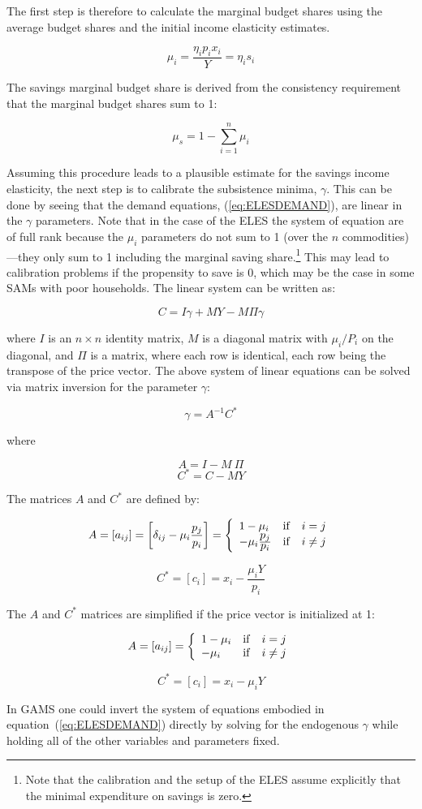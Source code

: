 The first step is therefore to calculate the marginal budget shares using the average budget
shares and the initial income elasticity estimates.

\[
   \mu _i = \frac {\eta_i p_i x_i} {Y} = {\eta _i}{s_i}
\]

The savings marginal budget share is derived from the consistency requirement that the marginal
budget shares sum to 1:

\[
   \mu_s = 1 - \sum\limits_{i = 1}^n {{\mu _i}}
\]

Assuming this procedure leads to a plausible estimate for the savings income elasticity, the next
step is to calibrate the subsistence minima, $\gamma$. This can be done by seeing that the demand
equations, (\ref{eq:ELESDEMAND}), are linear in the $\gamma$ parameters. Note that in the case of
the ELES the system of equation are of full rank because the $\mu_i$ parameters do not sum to 1
(over the $n$ commodities)---they only sum to 1 including the marginal saving share.\footnote{Note
that the calibration and the setup of the ELES assume explicitly that the minimal expenditure on
savings is zero.}
This may lead to calibration problems if the propensity to save is 0, which may be the case in
some SAMs with poor households. The linear system can be written as:

\[
   C = I\gamma  + MY - M \Pi \gamma
\]

\noindent where $I$ is an $n \times n$ identity matrix, $M$ is a diagonal matrix with
$\mu_i / P_i$ on the diagonal, and $\Pi$ is a matrix, where each row is identical, each row being
the transpose of the price vector. The above system of linear equations can be solved via matrix
inversion for the parameter $\gamma$:

\[
\gamma = A^{-1} C^*
\]

\noindent where

\[A = I - M\ \Pi \]
\[{C^*} = C - MY\]

The matrices $A$ and $C^*$ are defined by:

\[
   A = \left[ {{a_{ij}}} \right] = \left[ \delta_{ij} -  \mu_i\frac{p_j}{p_i}\right] =
   \left\{ {\begin{array}{*{20}{l}}
   {1 - {\mu _i}} & {{\rm{if}}} & {i = j}\\
   { - {\mu _i} \frac{\displaystyle p_j} {\displaystyle p_i}} & {{\rm{if}}} & {i \ne j}
\end{array}} \right.
\]

\[{C^*} = \left[ {{c_i}} \right] = {x_i} - \frac{{{\mu _i}Y}}{{{p_i}}}\]

\noindent The $A$ and $C^*$ matrices are simplified if the price vector is initialized at 1:

\[A = \left[ {{a_{ij}}} \right] = \left\{ {\begin{array}{*{20}{l}}
{1 - {\mu _i}}&{{\rm{if}}}&{i = j}\\
{ - {\mu _i}}&{{\rm{if}}}&{i \ne j}
\end{array}} \right.\]

\[{C^*} = \left[ {{c_i}} \right] = {x_i} - {\mu _i}Y\]

In GAMS one could invert the system of equations embodied in equation~(\ref{eq:ELESDEMAND}) directly
by solving for the endogenous $\gamma$ while holding all of the other variables and parameters
fixed.
